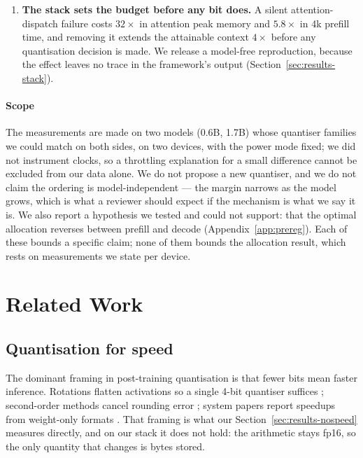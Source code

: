 \documentclass[5p]{elsarticle}
\begin{document}
\begin{enumerate}
\item \textbf{The stack sets the budget before any bit does.} A silent
      attention-dispatch failure costs $32\times$ in attention peak memory and
      $5.8\times$ in 4k prefill time, and removing it extends the attainable
      context $4\times$ before any quantisation decision is made. We release a
      model-free reproduction, because the effect leaves no trace in the
      framework's output (Section~\ref{sec:results-stack}).
\end{enumerate}

\paragraph*{Scope}
The measurements are made on two models (0.6B, 1.7B) whose quantiser families we
could match on both sides, on two devices, with the power mode fixed; we did not
instrument clocks, so a throttling explanation for a small difference cannot be
excluded from our data alone. We do not propose a new quantiser, and we do not
claim the ordering is model-independent --- the margin narrows as the model
grows, which is what a reviewer should expect if the mechanism is what we say it
is. We also report a hypothesis we tested and could not support: that the
optimal allocation reverses between prefill and decode
(Appendix~\ref{app:prereg}). Each of these bounds a specific claim; none of them
bounds the allocation result, which rests on measurements we state per device.

\section{Related Work}
\label{sec:related}

\subsection{Quantisation for speed}
The dominant framing in post-training quantisation is that fewer bits mean
faster inference. Rotations flatten activations so a single 4-bit quantiser
suffices \cite{quarot,spinquant,duquant,prefixquant,ostquant,spectrumquant};
second-order methods cancel rounding error \cite{gptq,gptaq}; system papers
report speedups from weight-only formats \cite{awq}. That framing is what our
Section~\ref{sec:results-nospeed} measures directly, and on our stack it does
not hold: the arithmetic stays fp16, so the only quantity that changes is bytes
stored.
\end{document}
